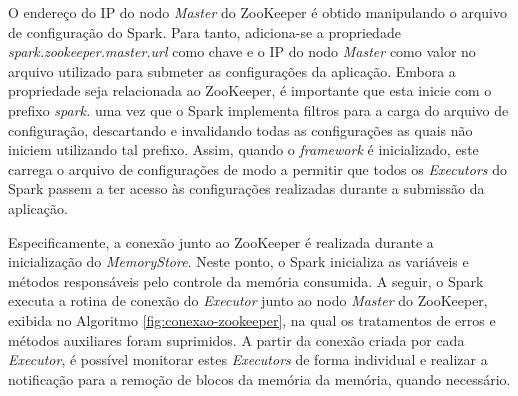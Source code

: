 O endereço do IP do nodo \textit{Master} do ZooKeeper é obtido manipulando o arquivo de configuração do Spark. Para tanto, adiciona-se a propriedade \textit{spark.zookeeper.master.url} como chave e o IP do nodo \textit{Master} como valor no arquivo utilizado para submeter as configurações da aplicação. Embora a propriedade seja relacionada ao ZooKeeper, é importante que esta inicie com o prefixo \textit{spark.} uma vez que o Spark implementa filtros para a carga do arquivo de configuração, descartando e invalidando todas as configurações as quais não iniciem utilizando tal prefixo. Assim, quando o \textit{framework} é inicializado, este carrega o arquivo de configurações de modo a permitir que todos os \textit{Executors} do Spark passem a ter acesso às configurações realizadas durante a submissão da aplicação.

Especificamente, a conexão junto ao ZooKeeper é realizada durante a inicialização do \textit{MemoryStore}. Neste ponto, o Spark inicializa as variáveis e métodos responsáveis pelo controle da memória consumida. A seguir, o Spark executa a rotina de conexão do \textit{Executor} junto ao nodo \textit{Master} do ZooKeeper, exibida no Algoritmo \ref{fig:conexao-zookeeper}, na qual os tratamentos de erros e métodos auxiliares foram suprimidos. A partir da conexão criada por cada \textit{Executor}, é possível monitorar estes \textit{Executors} de forma individual e realizar a notificação para a remoção de blocos da memória da memória, quando necessário.


